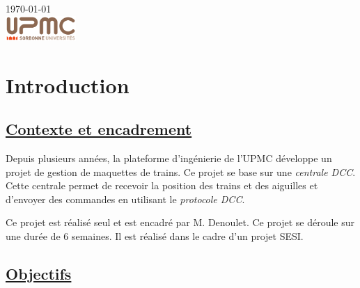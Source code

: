 \begin{titlepage}
{\large \today}\\[2cm] %


\includegraphics[width=0.2\textwidth]{logo.png}


\vfill %

\end{titlepage}




\section{Introduction}
\label{sec:introduction}

\subsection{\underline{Contexte et encadrement}}

Depuis plusieurs ann\'ees, la plateforme d'ingénierie de l'UPMC d\'eveloppe un projet de
gestion de maquettes de trains. Ce projet se base sur une
\emph{centrale DCC}. Cette centrale permet de recevoir la position des
trains et des aiguilles et d'envoyer des commandes en utilisant le
\emph{protocole DCC}.

Ce projet est r\'ealis\'e seul et est encadr\'e par M. Denoulet. Ce projet se d\'eroule sur une dur\'ee de 6 semaines.
Il est r\'ealis\'e dans le cadre d'un projet SESI.

\subsection{\underline{Objectifs}}


